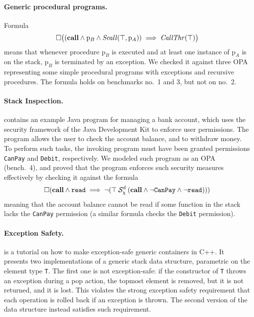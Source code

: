 \documentclass[9pt,a4paper]{article}
\begin{document}
\paragraph{Generic procedural programs.}
Formula
\[
  \square \big((\mathbf{call} \land \mathrm{p}_B \land
    \mathit{Scall}(\top, \mathrm{p}_A))
    \implies \mathit{CallThr}(\top) \big)
\]
means that whenever procedure $\mathrm{p}_B$ is executed and at least
one instance of $\mathrm{p}_A$ is on the stack, $\mathrm{p}_B$ is
terminated by an exception.  We checked it against three OPA
representing some simple procedural programs with exceptions and
recursive procedures.  The formula holds on benchmarks no.\ 1 and 3,
but not on no.\ 2.

\paragraph{Stack Inspection.}
\cite{JensenLT99} contains an example Java program for managing a bank
account, which uses the security framework of the Java Development Kit
to enforce user permissions. The program allows the user to check the
account balance, and to withdraw money. To perform such tasks, the
invoking program must have been granted permissions \texttt{CanPay}
and \texttt{Debit}, respectively.  We modeled such program as an OPA
(bench.\ 4), and proved that the program enforces such security
measures effectively by checking it against the formula
\[
\square (\mathbf{call} \land \mathtt{read} \implies
  \neg ({\top} \mathbin{\mathcal{S}_\chi^d} {(\mathbf{call} \land
                         \neg \mathtt{CanPay}
                         \land \neg \mathtt{read})}))
\]
meaning that the account balance cannot be read if some function in
the stack lacks the \texttt{CanPay} permission (a similar formula
checks the \texttt{Debit} permission).

\paragraph{Exception Safety.}
\cite{Sutter97} is a tutorial on how to make exception-safe generic
containers in C++. It presents two implementations of a generic stack
data structure, parametric on the element type \texttt{T}. The first
one is not exception-safe: if the constructor of \texttt{T} throws an
exception during a pop action, the topmost element is removed, but it
is not returned, and it is lost.  This violates the strong exception
safety \cite{Abrahams00} requirement that each operation is rolled
back if an exception is thrown. The second version of the data
structure instead satisfies such requirement.
\end{document}

